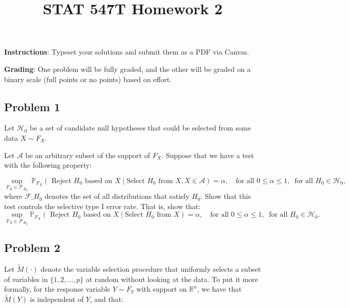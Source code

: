 \documentclass[
  letterpaper,
  DIV=11,
  numbers=noendperiod]{scrartcl}
\title{STAT 547T Homework 2}
\author{}
\date{}
\begin{document}
\maketitle
\ifdefined\Shaded\renewenvironment{Shaded}{\begin{tcolorbox}[interior hidden, sharp corners, enhanced, boxrule=0pt, frame hidden, breakable, borderline west={3pt}{0pt}{shadecolor}]}{\end{tcolorbox}}\fi

\textbf{Instructions}: Typeset your solutions and submit them as a PDF
via Canvas.

\textbf{Grading}: One problem will be fully graded, and the other will
be graded on a binary scale (full points or no points) based on effort.

\hypertarget{problem-1}{%
\subsection{Problem 1}\label{problem-1}}


Let $\mathcal{H}_0$ be a set of candidate null hypotheses that could be selected from some data $X \sim F_X$.

Let $\mathcal{A}$ be an arbitrary subset of the support of $F_X$. Suppose that we have a test with the following property:

$$ \underset{F_X \in \mathcal{F}_{H_0}}{\sup} ~\mathbb{P}_{F_X} (\text{ Reject } H_0 \text{ based on } X \mid \text{Select } H_0 \text{ from } X, X \in \mathcal{A}) = \alpha, ~~~ \text{ for all } 0 \leq \alpha \leq 1, ~ \text{ for all } H_0 \in \mathcal{H}_0, $$ where $\mathcal{F}\_{H_0}$ denotes the set of all distributions that satisfy $H_0$. Show that this test controls the selective type I error rate. That is, show that: $$ \underset{F_X \in \mathcal{F}_{H_0}}{\sup} \mathbb{P}_{F_X} ( \text{ Reject } H_0 \text{ based on } X \mid \text{Select } H_0 \text{ from } X) = \alpha, ~~~ \text{ for all } 0 \leq \alpha \leq 1, ~ \text{ for all } H_0 \in \mathcal{H}_0.$$

\hypertarget{problem-2}{%
\subsection{Problem 2}\label{problem-2}}


Let $\tilde M(\cdot)$ denote the variable selection procedure that uniformly selects a subset of variables in $\{1, 2, \ldots, p\}$ at random without looking at the data. To put it more formally, for the response variable $Y \sim F_Y$ with support on $\mathbb{R}^n$, we have that $\tilde M(Y)$ is independent of $Y$, and that:
\end{document}
